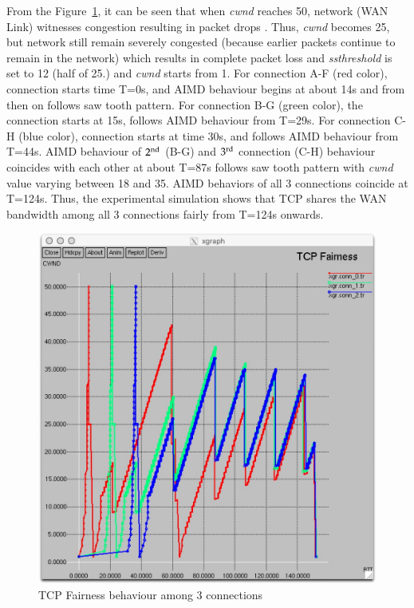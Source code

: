 \begin{multicols}{2}
From the Figure~\ref{chap2-fig08}, it can be seen that when \textit{cwnd} reaches 50, network (WAN Link) witnesses congestion resulting in packet drops . Thus, \textit{cwnd} becomes 25, but network still remain severely congested (because earlier packets continue to remain in the network) which results in complete packet loss and \textit{ssthreshold} is set to 12 (half of 25.) and \textit{cwnd} starts from 1. For connection A-F (red color), connection starts time T=0s, and AIMD behaviour begins at about 14s and from then on follows saw tooth pattern. For connection B-G (green color), the connection starts at 15s, follows AIMD behaviour from T=29s. For connection C-H (blue color), connection starts at time 30s, and follows AIMD behaviour from T=44s. AIMD behaviour of ${\rm 2}^{\text{nd}}$ (B-G) and ${\rm 3}^{\text{rd}}$ connection (C-H) behaviour coincides with each other at about T=87s follows saw tooth pattern with \textit{cwnd} value varying between 18 and 35. AIMD behaviors of all 3 connections coincide at T=124s. Thus, the experimental simulation shows that TCP shares the WAN bandwidth among all 3 connections fairly from T=124s onwards.

\begin{figure}[H]
\centering
\includegraphics[scale=.85]{src/Figures/chap2/chap2-fig08.jpg}
\caption{TCP Fairness behaviour among 3 connections}\label{chap2-fig08}
\end{figure}


\end{multicols}
